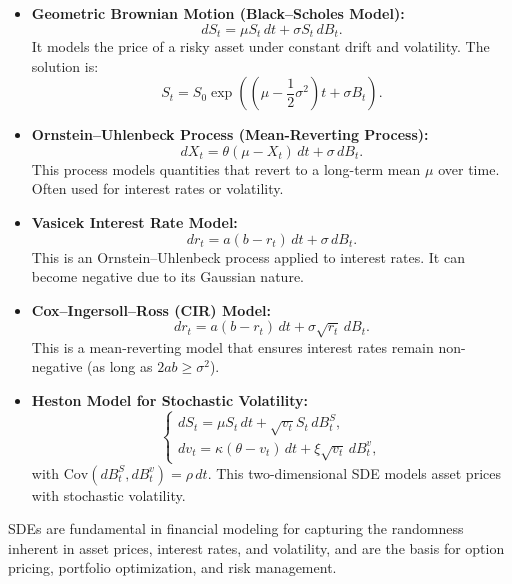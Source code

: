 \begin{itemize}
    \item \textbf{Geometric Brownian Motion (Black–Scholes Model):}
    \[
    dS_t = \mu S_t \, dt + \sigma S_t \, dB_t.
    \]
    It models the price of a risky asset under constant drift and volatility. The solution is:
    \[
    S_t = S_0 \exp\left( \left( \mu - \frac{1}{2} \sigma^2 \right)t + \sigma B_t \right).
    \]

    \item \textbf{Ornstein–Uhlenbeck Process (Mean-Reverting Process):}
    \[
    dX_t = \theta(\mu - X_t) \, dt + \sigma \, dB_t.
    \]
    This process models quantities that revert to a long-term mean \( \mu \) over time. Often used for interest rates or volatility.

    \item \textbf{Vasicek Interest Rate Model:}
    \[
    dr_t = a(b - r_t) \, dt + \sigma \, dB_t.
    \]
    This is an Ornstein–Uhlenbeck process applied to interest rates. It can become negative due to its Gaussian nature.

    \item \textbf{Cox–Ingersoll–Ross (CIR) Model:}
    \[
    dr_t = a(b - r_t) \, dt + \sigma \sqrt{r_t} \, dB_t.
    \]
    This is a mean-reverting model that ensures interest rates remain non-negative (as long as \( 2ab \geq \sigma^2 \)).

    \item \textbf{Heston Model for Stochastic Volatility:}
    \[
    \begin{cases}
    dS_t = \mu S_t \, dt + \sqrt{v_t} S_t \, dB_t^S, \\
    dv_t = \kappa(\theta - v_t) \, dt + \xi \sqrt{v_t} \, dB_t^v,
    \end{cases}
    \]
    with \( \text{Cov}(dB_t^S, dB_t^v) = \rho \, dt \). This two-dimensional SDE models asset prices with stochastic volatility.
\end{itemize}

SDEs are fundamental in financial modeling for capturing the randomness inherent in asset prices, interest rates, and volatility, and are the basis for option pricing, portfolio optimization, and risk management.